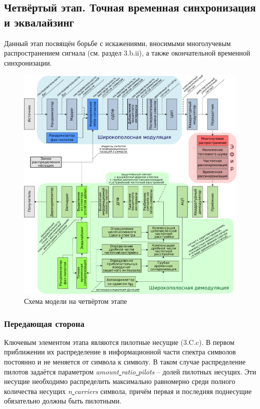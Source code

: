 \subsection{Четвёртый этап. Точная временная синхронизация и эквалайзинг}

Данный этап посвящён борьбе с искажениями, вносимыми многолучевым распространением сигнала (см. раздел 3.b.ii), а также окончательной временной синхронизации.

\begin{figure}[h!]
\centering
\includegraphics[width=1\textwidth]{OFDM-4.png}
\caption{Схема модели на четвёртом этапе} \label{fg:schem3}
\end{figure}

\subsubsection{Передающая сторона}
Ключевым элементом этапа являются пилотные несущие (3.C.c). В первом приближении их распределение в информационной части спектра символов постоянно и не меняется от символа к символу. В таком случае распределение пилотов задаётся параметром \textit{amount\underline{ }ratio\underline{ }pilots} -- долей  пилотных несущих. Эти несущие необходимо распределить максимально равномерно среди полного количества несущих \textit{n\underline{ }carriers} символа, причём первая и последняя поднесущие обязательно должны быть пилотными.

